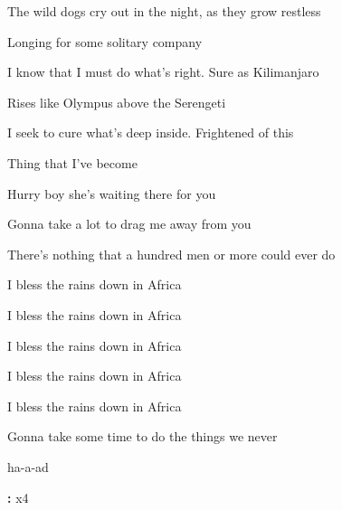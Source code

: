 \begin{song}
\bigskip

 The wild dogs cry out in the night, as they grow restless \par
{}Longing for some solitary company  \par
{} I know that I must do what's right. Sure as Kilimanjaro \par
{}Rises like Olympus above the Serengeti  \par
{} I seek to cure what's deep inside. Frightened of this \par
{}Thing that I've become  \par

\bigskip

\Chorus \par

\bigskip

         \par
{}   Hurry boy she's waiting there for you  \par

\bigskip

 Gonna take a lot to drag me away from you \par
{} There's nothing that a hundred men or more could ever do \par
{} I bless the rains down in Africa \par
{} I bless the rains down in Africa  \par
{} I bless the rains down in Africa  \par
{} I bless the rains down in Africa \par
{} I bless the rains down in Africa  \par
{} Gonna take some time to do the things we never \par
{}ha-a-ad \par

\bigskip

\Outro\textbf{:}    x4 \par

\end{song}